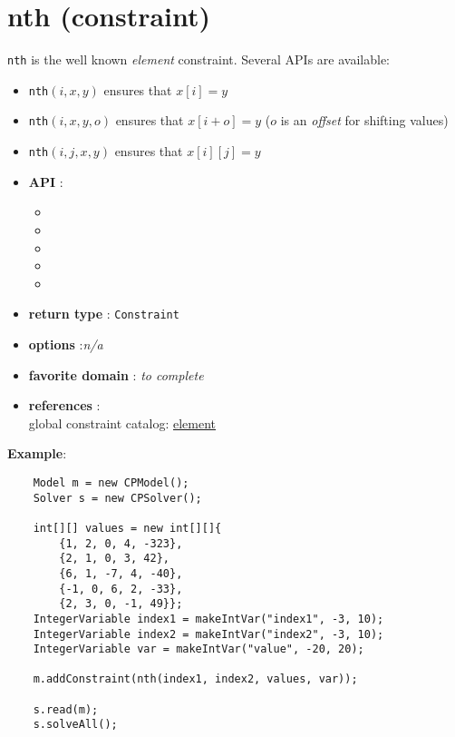 \label{nth}
\hypertarget{nth}{}

\section{nth (constraint)}\label{nth:nthconstraint}\hypertarget{nth:nthconstraint}{}
\texttt{nth} is the well known \emph{element} constraint.
Several APIs are available: 
\begin{notedef}
\begin{itemize}
\item \texttt{nth}$(i,x,y)$ ensures that $x[i]=y$
\item \texttt{nth}$(i,x,y,o)$ ensures that $x[i+o]=y$ ($o$ is an \emph{offset} for shifting values)
\item \texttt{nth}$(i,j,x,y)$ ensures that $x[i][j]=y$
\end{itemize}
\end{notedef}

\begin{itemize}
	\item \textbf{API} :
	\begin{itemize}
		\item {}
		\item {}
		\item {}
		\item {}
		\item {}
	\end{itemize}
	\item \textbf{return type} : \texttt{Constraint}
	\item \textbf{options} :\emph{n/a}
	\item \textbf{favorite domain} : \emph{to complete}
	\item \textbf{references} :\\
      global constraint catalog: \href{http://www.emn.fr/x-info/sdemasse/gccat/Celement.html}{element}
\end{itemize}

\textbf{Example}:
\begin{lstlisting}
	Model m = new CPModel();
	Solver s = new CPSolver();            
	
	int[][] values = new int[][]{
	    {1, 2, 0, 4, -323},
	    {2, 1, 0, 3, 42},
	    {6, 1, -7, 4, -40},
	    {-1, 0, 6, 2, -33},
	    {2, 3, 0, -1, 49}};
	IntegerVariable index1 = makeIntVar("index1", -3, 10);
	IntegerVariable index2 = makeIntVar("index2", -3, 10);
	IntegerVariable var = makeIntVar("value", -20, 20);
	
	m.addConstraint(nth(index1, index2, values, var));
	
	s.read(m);
	s.solveAll();
\end{lstlisting} 
